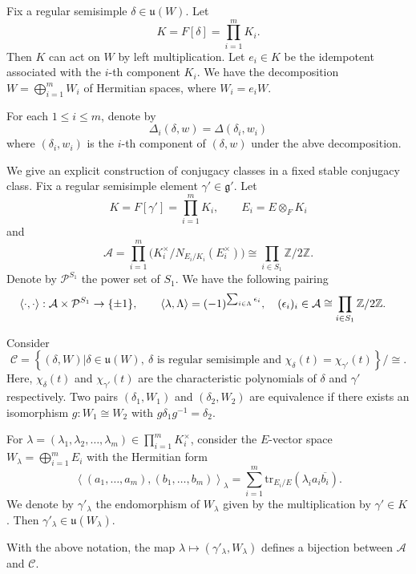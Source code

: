 \documentclass[a4paper]{amsart}
\newcommand{\CA}{{\mathcal {A}}} \newcommand{\CB}{{\mathcal {B}}}
\newcommand{\CC}{{\mathcal {C}}} \renewcommand{\CD}{{\mathcal {D}}}
\newcommand{\fg}{{\mathfrak{g}}} \newcommand{\fh}{{\mathfrak{h}}}
\newcommand{\fu}{{\mathfrak{u}}} \newcommand{\fv}{{\mathfrak{v}}}
\newcommand{\tr}{{\mathrm{tr}}}\newcommand{\tor}{{\mathrm{tor}}}
\theoremstyle{plain}
\theoremstyle{remark} \newtheorem{remark}[thm]{Remark}
\theoremstyle{exercise} \newtheorem{exercise}[thm]{Exercise}
\theoremstyle{example} \newtheorem{example}[thm]{Example}
\theoremstyle{question} \newtheorem{question}[thm]{Question}
\theoremstyle{assumption} \newtheorem{assumption}[thm]{Assumption}
\numberwithin{equation}{section}
\begin{document}
Fix a regular semisimple $\delta\in\mathfrak u(W)$. Let $$K=F[\delta]=\prod_{i=1}^{m}K_i.$$
Then $K$ can act on $W$ by left multiplication. Let $e_i\in K$ be the idempotent associated with the \(i\)-th component $K_i$. We have the decomposition $W=\bigoplus_{i=1}^m W_i$ of Hermitian spaces, where $W_i=e_iW$. 

For each $1 \leq i \leq m$, denote by
\[\Delta_i(\delta,w)=\Delta(\delta_i,w_i)\]
where $(\delta_i,w_i)$ is the $i$-th component of 
$(\delta,w)$ under the abve decomposition.



We give an explicit construction of conjugacy classes in a fixed
stable conjugacy class. Fix a regular semisimple element
$\gamma'\in\fg'$. Let
\[
K=F[\gamma']=\prod_{i=1}^{m}K_i,\qquad
E_i=E\otimes_F K_i
\]
and
\[\CA=\prod_{i=1}^{m}\big(K_i^\times/N_{E_i/K_i}(E_i^{\times})\big)
\cong
\prod_{i\in S_1}\mathbb Z/2\mathbb Z.\]
Denote by $\mathcal P^{S_1}$ the power set of $S_1$.  We have
the following pairing
\begin{align*}
    \langle \cdot, \cdot \rangle:\mathcal A\times\mathcal P^{S_1}&\to\{\pm1\},
    \qquad\langle\lambda,\Lambda\rangle=(-1)^{\sum_{i\in \Lambda}\epsilon_i}, \quad (\epsilon_i)_i \in \CA \cong \prod_{i \in S_1} \BZ/2\BZ.
\end{align*}



Consider
\[
\CC=\left\{(\delta,W)|\delta\in\fu(W),\
\delta\text{ is regular semisimple and }\chi_{\delta}(t)=\chi_{\gamma'}(t)
\right\}\big/\cong.
\]
Here, $\chi_{\delta}(t)$ and $\chi_{\gamma'}(t)$ are the characteristic polynomials of $\delta$ and $\gamma'$ respectively. Two pairs
$(\delta_1,W_1)$ and $(\delta_2,W_2)$ are equivalence if there exists an isomorphism $g:W_1 \cong W_2$  with $g\delta_1 g^{-1}=\delta_2$.

For $\lambda=(\lambda_1,\lambda_2,\ldots,\lambda_m)\in\prod_{i=1}^{m}K_i^\times$, consider the $E$-vector space $W_\lambda=\bigoplus_{i=1}^{m}E_i$
with the Hermitian form
\[
\left\langle
(a_1,\ldots,a_m),(b_1,\ldots,b_m)
\right\rangle_\lambda
=
\sum_{i=1}^{m}
\tr_{E_i/E}
\left(\lambda_i a_i\overline{b_i}\right).
\]
We denote by $\gamma'_\lambda$ the endomorphism of
$W_\lambda$ given by the multiplication by $\gamma'\in K$. Then $\gamma'_{\lambda}\in\fu(W_{\lambda})$.

\begin{prop} \label{porp-1} 
    With the above notation, the map $\lambda\mapsto (\gamma'_{\lambda},W_\lambda)$
defines a bijection between $\CA$ and $\CC$. 
\end{prop}
\end{document}
